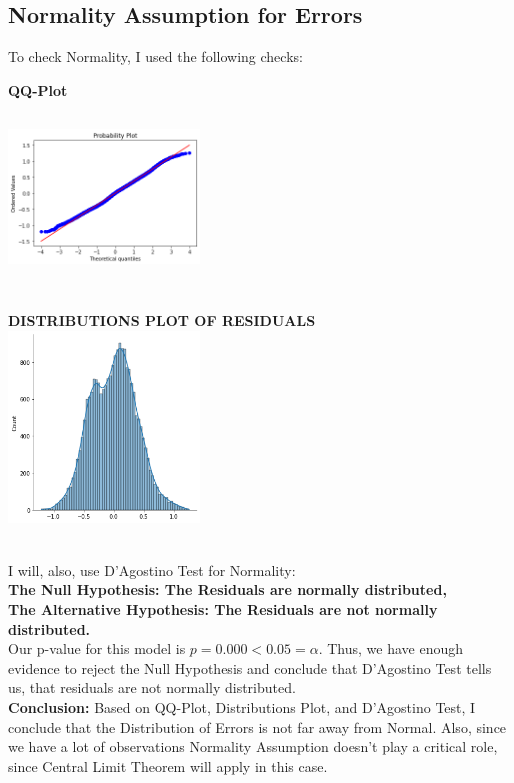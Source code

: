 \documentclass[10pt]{article}
\begin{document}
\subsection*{Normality Assumption for Errors}
To check Normality, I used the following checks:\\
\begin{minipage}{0.5\textwidth}
\begin{center}
	\textbf{QQ-Plot}\\
	\includegraphics[width=2in,height=2in]{qq_plot_linear_model}
\end{center}%
\end{minipage}%
\begin{minipage}{0.5\textwidth}
	\begin{center}
		\textbf{DISTRIBUTIONS PLOT OF RESIDUALS}\\
		\includegraphics[width=2in,height=2in]{dist_plot_resid_linear_model}
	\end{center}%
\end{minipage}%
\\
I will, also, use D'Agostino Test for Normality:\\
\textbf{The Null Hypothesis:  The Residuals are normally distributed,\\
	The Alternative Hypothesis:  The Residuals are not normally distributed.}\\
Our p-value for this model is \(p=0.000 < 0.05 = \alpha\). Thus, we have enough evidence to reject the Null Hypothesis and conclude that D'Agostino Test tells us, that residuals are not normally distributed.\\
\vskip 0.1in
\noindent
\textbf{Conclusion:} Based on QQ-Plot, Distributions Plot, and D'Agostino Test, I conclude that the Distribution of Errors is not far away from Normal. Also, since we have a lot of observations Normality Assumption doesn't play a critical role, since Central Limit Theorem will apply in this case.
\end{document}
